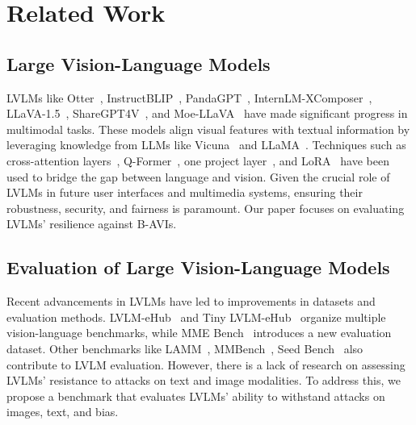 \section{Related Work}
\label{sec:related}
\subsection{Large Vision-Language Models}
LVLMs like Otter~\cite{li2023otter}, InstructBLIP~\cite{dai2023instructblip}, PandaGPT~\cite{su2023pandagpt}, InternLM-XComposer~\cite{zhang2023internlm}, LLaVA-1.5~\cite{liu2023improved}, ShareGPT4V~\cite{chen2023sharegpt4v}, and Moe-LLaVA~\cite{lin2024moe} have made significant progress in multimodal tasks. These models align visual features with textual information by leveraging knowledge from LLMs like Vicuna~\cite{vicuna} and LLaMA~\cite{touvron2023llama}. Techniques such as cross-attention layers~\cite{openfamingov2}, Q-Former~\cite{li2023blip}, one project layer~\cite{zhu2023minigpt}, and LoRA~\cite{hu2021lora} have been used to bridge the gap between language and vision. Given the crucial role of LVLMs in future user interfaces and multimedia systems, ensuring their robustness, security, and fairness is paramount. Our paper focuses on evaluating LVLMs' resilience against B-AVIs.

\subsection{Evaluation of Large Vision-Language Models}
Recent advancements in LVLMs have led to improvements in datasets and evaluation methods. LVLM-eHub~\cite{xu2023lvlm} and Tiny LVLM-eHub~\cite{shao2023tiny} organize multiple vision-language benchmarks, while MME Bench~\cite{fu2023mme} introduces a new evaluation dataset. Other benchmarks like LAMM~\cite{yin2023lamm}, MMBench~\cite{liu2023mmbench}, Seed Bench~\cite{li2023seed} also contribute to LVLM evaluation. 
However, there is a lack of research on assessing LVLMs' resistance to attacks on text and image modalities. To address this, we propose a benchmark that evaluates LVLMs' ability to withstand attacks on images, text, and bias.

